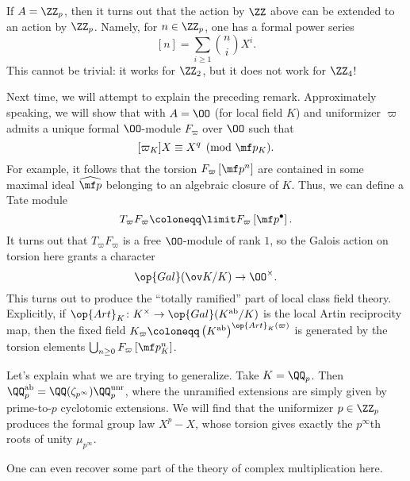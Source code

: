 \documentclass[../notes.tex]{subfiles}
\begin{document}
\begin{remark}
	If $A=\ZZ_p$, then it turns out that the action by $\ZZ$ above can be extended to an action by $\ZZ_p$. Namely, for $n\in\ZZ_p$, one has a formal power series
	\[[n]=\sum_{i\ge1}\binom niX^i.\]
	This cannot be trivial: it works for $\ZZ_2$, but it does not work for $\ZZ_4$!
\end{remark}
Next time, we will attempt to explain the preceding remark. Approximately speaking, we will show that with $A=\OO$ (for local field $K$) and uniformizer $\varpi$ admits a unique formal $\OO$-module $F_\varpi$ over $\OO$ such that
\[[\varpi_K]X\equiv X^q\pmod{\mf p_K}.\]
For example, it follows that the torsion $F_\varpi\left[\mf p^n\right]$ are contained in some maximal ideal $\widehat{\mf p}$ belonging to an algebraic closure of $K$. Thus, we can define a Tate module
\[T_\varpi F_\varpi\coloneqq\limit F_\varpi\left[\mf p^\bullet\right].\]
It turns out that $T_\varpi F_\varpi$ is a free $\OO$-module of rank $1$, so the Galois action on torsion here grants a character
\[\op{Gal}(\ov K/K)\to\OO^\times.\]
This turns out to produce the ``totally ramified'' part of local class field theory. Explicitly, if $\op{Art}_K\colon K^\times\to\op{Gal}(K^{\mathrm{ab}}/K)$ is the local Artin reciprocity map, then the fixed field $K_\varpi\coloneqq\left(K^{\mathrm{ab}}\right)^{\op{Art}_K(\varpi)}$ is generated by the torsion elements $\bigcup_{n\ge0}F_\varpi\left[\mf p_K^n\right]$.
\begin{example}
	Let's explain what we are trying to generalize. Take $K=\QQ_p$. Then $\QQ_p^{\mathrm{ab}}=\QQ(\zeta_{p^\infty})\QQ_p^{\mathrm{unr}}$, where the unramified extensions are simply given by prime-to-$p$ cyclotomic extensions. We will find that the uniformizer $p\in\ZZ_p$ produces the formal group law $X^p-X$, whose torsion gives exactly the $p^\infty$th roots of unity $\mu_{p^\infty}$.
\end{example}
One can even recover some part of the theory of complex multiplication here.
\end{document}
